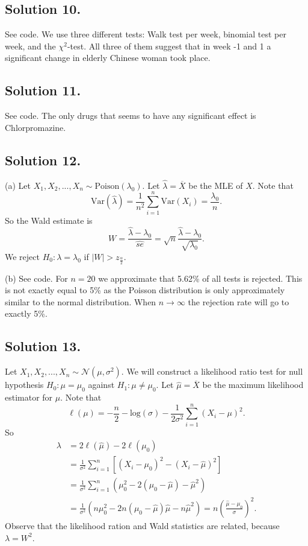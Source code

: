 \subsection*{Solution 10.}

See code.
We use three different tests: Walk test per week, binomial test per week, and the $\chi^2$-test.
All three of them suggest that in week -1 and 1 a significant change in elderly Chinese woman took place.


\subsection*{Solution 11.}

See code.
The only drugs that seems to have any significant effect is Chlorpromazine.


\subsection*{Solution 12.}

(a) Let $X_1, X_2, ..., X_n \sim \mathrm{Poison}(\lambda_0)$.
Let $\hat{\lambda} = \overline{X}$ be the MLE of $X$.
Note that
$$
\mathrm{Var}(\hat{\lambda}) = \frac{1}{n^2} \sum_{i=1}^n \mathrm{Var}(X_i) = \frac{\lambda_0}{n}.
$$
So the Wald estimate is
$$
W = \frac{\hat{\lambda} - \lambda_0}{\hat{se}} = \sqrt{n} \frac{\hat{\lambda} - \lambda_0}{\sqrt{\lambda_0}}.
$$
We reject $H_0: \lambda = \lambda_0$ if $|W| > z_{\frac{\alpha}{2}}$.

(b) See code.
For $n = 20$ we approximate that 5.62\% of all tests is rejected.
This is not exactly equal to 5\% as the Poisson distribution is only approximately similar to the normal distribution.
When $n \to \infty$ the rejection rate will go to exactly 5\%.


\subsection*{Solution 13.}

Let $X_1, X_2, ..., X_n \sim \mathcal{N}(\mu, \sigma^2)$.
We will construct a likelihood ratio test for null hypothesis $H_0: \mu = \mu_0$ against $H_1: \mu \neq \mu_0$.
Let $\hat{\mu} = \overline{X}$ be the maximum likelihood estimator for $\mu$.
Note that
$$
\ell(\mu) = -\frac{n}{2} - \mathrm{log}(\sigma) - \frac{1}{2\sigma^2} \sum_{i=1}^n (X_i - \mu)^2.
$$
So
\begin{equation*}
\begin{split}
\lambda &= 2\ell(\hat{\mu}) - 2\ell(\mu_0) \\
    &= \frac{1}{\sigma^2} \sum_{i=1}^n \left[ (X_i - \mu_0)^2 - (X_i - \hat{\mu})^2 \right] \\
    &= \frac{1}{\sigma^2} \sum_{i=1}^n (\mu_0^2 - 2(\mu_0 - \hat{\mu}) - \hat{\mu}^2) \\
    &= \frac{1}{\sigma^2} (n\mu_0^2 - 2n(\mu_0 - \hat{\mu})\hat{\mu} - n\hat{\mu}^2)
    = n \left(\frac{\hat{\mu} - \mu_0}{\sigma}\right)^2.
\end{split}
\end{equation*}
Observe that the likelihood ration and Wald statistics are related, because $\lambda = W^2$.



